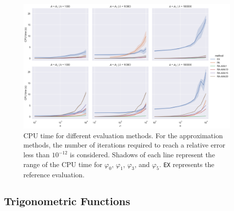 \begin{figure}[h]
    \centering
    \includegraphics[width=.9\textwidth]{img/krylovapproximation/cputime_methods.png}
    \caption{
        CPU time for different evaluation methods. For the approximation methods,
        the number of iterations required to reach a relative error less than $10^{-12}$
        is considered. Shadows of each line represent the range of the CPU time for
        $\varphi_0$, $\varphi_1$, $\varphi_3$, and $\varphi_5$.
        \texttt{EX} represents the reference evaluation.
    }
    \label{fig:krylovapproximationcputime}
\end{figure}

\FloatBarrier

\subsection{Trigonometric Functions}
\label{sec:resultstrigonometricfunctions}

